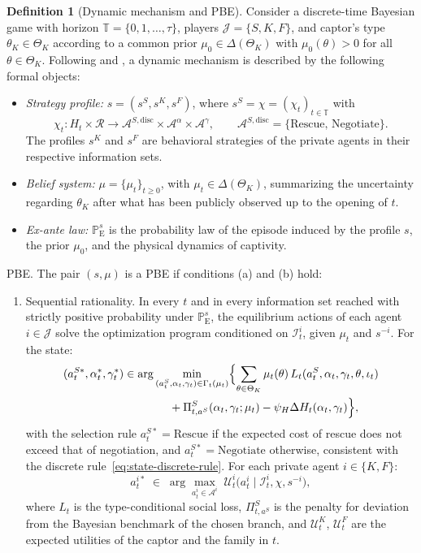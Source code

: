 \documentclass[ecta,nameyear,draft]{econsocart}
\providecommand{\textcite}{\citet}
\theoremstyle{plain}
\theoremstyle{definition}
\newtheorem{definition}[theorem]{Definition}
\newcommand{\ProbE}{\mathbb{P}_{\mathrm{E}}}
\newcommand{\ThetaK}{\Theta_K}
\newcommand{\1}{\mathbf{1}}
\begin{document}
\begin{definition}[Dynamic mechanism and PBE]
\label{def:pbe-mechanism}
Consider a discrete-time Bayesian game with horizon $\mathbb{T}=\{0,1,\ldots,\tau\}$, players $\mathcal{J}=\{S,K,F\}$, and captor's type $\theta_K\in\ThetaK$ according to a common prior $\mu_0\in\Delta(\ThetaK)$ with $\mu_0(\theta)>0$ for all $\theta\in\ThetaK$. Following \textcite{FudenbergTirole1991} and \textcite{KrepsWilson1982}, a dynamic mechanism is described by the following formal objects:

\begin{itemize}
  \item \emph{Strategy profile:} $s=(s^S,s^K,s^F)$, where $s^S=\chi=(\chi_t)_{t\in\mathbb{T}}$ with
  \[
    \chi_t \colon H_t\times\mathcal{R}
    \longrightarrow \mathcal{A}^{S,\mathrm{disc}}\times\mathcal{A}^{\alpha}\times\mathcal{A}^{\gamma},
    \qquad
    \mathcal{A}^{S,\mathrm{disc}}=\{\text{Rescue},\,\text{Negotiate}\}.
  \]
  The profiles $s^K$ and $s^F$ are behavioral strategies of the private agents in their respective information sets.
  \item \emph{Belief system:} $\mu=\{\mu_t\}_{t\ge 0}$, with $\mu_t\in\Delta(\ThetaK)$, summarizing the uncertainty regarding $\theta_K$ after what has been publicly observed up to the opening of $t$.
  \item \emph{Ex-ante law:} $\ProbE^s$ is the probability law of the episode induced by the profile $s$, the prior $\mu_0$, and the physical dynamics of captivity.
\end{itemize}

\smallskip
\noindent PBE. The pair $(s,\mu)$ is a PBE if conditions \textup{(a)} and \textup{(b)} hold:
\begin{enumerate}
  \item[\textup{(a)}] Sequential rationality. In every $t$ and in every information set reached with strictly positive probability under $\ProbE^s$, the equilibrium actions of each agent $i\in\mathcal{J}$ solve the optimization program conditioned on $\mathcal{I}_t^i$, given $\mu_t$ and $s^{-i}$. For the state:
  \[
  \begin{aligned}
  (a_t^{S\ast},\alpha_t^\ast,\gamma_t^\ast)
  &\in
  \arg\min_{(a_t^S,\alpha_t,\gamma_t)\in\Gamma_t(\mu_t)}
  \Bigl\{
  \sum_{\theta\in\ThetaK}\mu_t(\theta)\,L_t(a_t^S,\alpha_t,\gamma_t,\theta,\iota_t)\\
  &\qquad\qquad
  +\Pi_{t,a^S}^S(\alpha_t,\gamma_t;\mu_t)-\psi_H\Delta H_t(\alpha_t,\gamma_t)
  \Bigr\},
  \end{aligned}
  \]
  with the selection rule $a_t^{S\ast}=\text{Rescue}$ if the expected cost of rescue does not exceed that of negotiation, and $a_t^{S\ast}=\text{Negotiate}$ otherwise, consistent with the discrete rule~\eqref{eq:state-discrete-rule}. For each private agent $i\in\{K,F\}$:
  \[
  a_t^{i\ast}\;\in\;
  \arg\max_{a_t^i\in\mathcal{A}^i}
  \;\mathcal{U}^i_t\!\bigl(a_t^i\mid \mathcal{I}_t^i,\chi,s^{-i}\bigr),
  \]
  where $L_t$ is the type-conditional social loss, $\Pi_{t,a^S}^S$ is the penalty for deviation from the Bayesian benchmark of the chosen branch, and $\mathcal{U}^K_t$, $\mathcal{U}^F_t$ are the expected utilities of the captor and the family in $t$.


\end{enumerate}
\end{definition}
\end{document}
